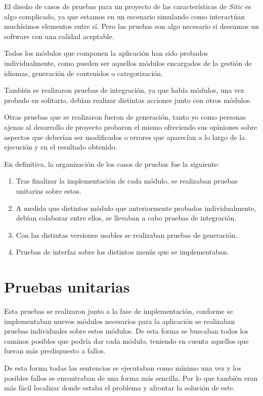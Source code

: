 El diseño de casos de pruebas para un proyecto de las características de \emph{Sitic}
es algo complicado, ya que estamos en un escenario simulando como interactúan muchísimos
elementos entre sí. Pero las pruebas son algo necesario si deseamos un software con una
calidad aceptable.

Todos los módulos que componen la aplicación han sido probados individualmente, como pueden
ser aquellos módulos encargados de la gestión de idiomas, generación de contenidos o categorización.

También se realizaron pruebas de integración, ya que había módulos, una vez probado en solitario, 
debían realizar distintas acciones junto con otros módulos.

Otras pruebas que se realizaron fueron de generación, tanto yo como
personas ajenas al desarrollo de proyecto probaron el
mismo ofreciendo sus opiniones sobre aspectos que deberían ser modificados o
errores que aparecían a lo largo de la ejecución y en el resultado obtenido.

En definitiva, la organización de los casos de pruebas fue la siguiente:

\begin{enumerate}
    \item Tras finalizar la implementación de cada módulo, se realizaban pruebas unitarias sobre estos.
    \item A medida que distintos módulo que anteriormente probados individualmente, debían colaborar entre ellos, se
    llevaban a cabo pruebas de integración.
    \item Con las distintas versiones usables se realizaban pruebas de generación.
    \item Pruebas de interfaz sobre los distintos menús que se implementaban.
\end{enumerate}

\section{Pruebas unitarias}

Esta pruebas se realizaron junto a la fase de implementación, conforme se implementaban nuevos módulos necesarios para la aplicación
se realizaban pruebas individuales sobre estos módulos. De esta forma se buscaban todos los caminos posibles que podría dar cada
módulo, teniendo en cuenta aquellos que fueran más predispuesto a fallos.

De esta forma todas las sentencias se ejecutaban como mínimo una vez y los posibles fallos se encontraban de una forma más sencilla.
Por lo que también eran más fácil localizar donde estaba el problema y afrontar la solución de este.

